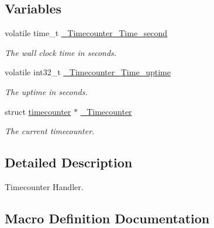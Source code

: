 \subsection*{Variables}
\begin{DoxyCompactItemize}
\item 
\mbox{\label{group__RTEMSScoreTimecounter_ga3700d3e6fdd46266e346906f004f63fa}} 
volatile time\+\_\+t \mbox{\hyperlink{group__RTEMSScoreTimecounter_ga3700d3e6fdd46266e346906f004f63fa}{\+\_\+\+Timecounter\+\_\+\+Time\+\_\+second}}
\begin{DoxyCompactList}\small\item\em The wall clock time in seconds. \end{DoxyCompactList}\item 
volatile int32\+\_\+t \mbox{\hyperlink{group__RTEMSScoreTimecounter_ga1a3182fb77802b4150ad5916ab5587eb}{\+\_\+\+Timecounter\+\_\+\+Time\+\_\+uptime}}
\begin{DoxyCompactList}\small\item\em The uptime in seconds. \end{DoxyCompactList}\item 
\mbox{\label{group__RTEMSScoreTimecounter_gaed0873d38a7b85e5e2b3abfe22c7442c}} 
struct \mbox{\hyperlink{structtimecounter}{timecounter}} $\ast$ \mbox{\hyperlink{group__RTEMSScoreTimecounter_gaed0873d38a7b85e5e2b3abfe22c7442c}{\+\_\+\+Timecounter}}
\begin{DoxyCompactList}\small\item\em The current timecounter. \end{DoxyCompactList}\end{DoxyCompactItemize}


\subsection{Detailed Description}
Timecounter Handler. 



\subsection{Macro Definition Documentation}
\mbox{\label{group__RTEMSScoreTimecounter_gae15b839246f2681ad7bab1a662b48698}} 
